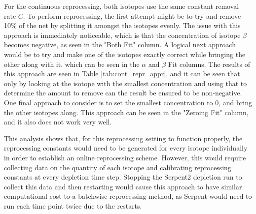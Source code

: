 For the continuous reprocessing, both isotopes use the same constant removal rate $C$.%
To perform reprocessing, the first attempt might be to try and remove 10\% of the net by splitting it amongst the isotopes evenly. The issue with this approach is immediately noticeable, which is that the concentration of isotope $\beta$ becomes negative, as seen in the "Both Fit" column. A logical next approach would be to try and make one of the isotopes exactly correct while bringing the other along with it, which can be seen in the $\alpha$ and $\beta$ Fit columns. The results of this approach are seen in Table \ref{tab:cont_repr_appr}, and it can be seen that only by looking at the isotope with the smallest concentration and using that to determine the amount to remove can the result be ensured to be non-negative. One final approach to consider is to set the smallest concentration to 0, and bring the other isotopes along. This approach can be seen in the "Zeroing Fit" column, and it also does not work very well.

This analysis shows that, for this reprocessing setting to function properly, the reprocessing constants would need to be generated for every isotope individually in order to establish an online reprocessing scheme. However, this would require collecting data on the quantity of each isotope and calibrating reprocessing constants at every depletion time step. Stopping the Serpent2 depletion run to collect this data and then restarting would cause this approach to have similar computational cost to a batchwise reprocessing method, as Serpent would need to run each time point twice due to the restarts.



